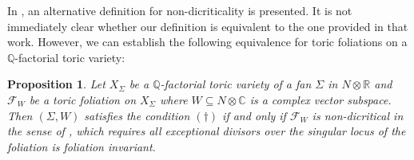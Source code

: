 \documentclass[12pt,reqno]{amsart}
\newtheorem{proposition}[theorem]{Proposition}
\theoremstyle{definition}
\newcommand\cF{{\mathcal{F}}}
\newcommand\bC{{\mathbb C}}
\newcommand\bQ{{\mathbb Q}}
\newcommand\bR{{\mathbb R}}
\begin{document}
In \cite{wang2023toric}, an alternative definition for non-dicriticality is presented. 
It is not immediately clear whether our definition is equivalent to the one provided in that work. 
However, we can establish the following equivalence for toric foliations on a $\bQ$-factorial toric variety:
\begin{proposition}\label{wang_defn}
    Let $X_\Sigma$ be a $\bQ$-factorial toric variety of a fan $\Sigma$ in $N\otimes\bR$ and $\cF_W$ be a toric foliation on $X_\Sigma$ where $W\subseteq N\otimes\bC$ is a complex vector subspace. 
    Then $(\Sigma,W)$ satisfies the condition $(\dagger)$ if and only if $\cF_W$ is non-dicritical in the sense of \cite[Definition 3.6]{wang2023toric}, which requires all exceptional divisors over the singular locus of the foliation is foliation invariant. 
\end{proposition}
\end{document}
